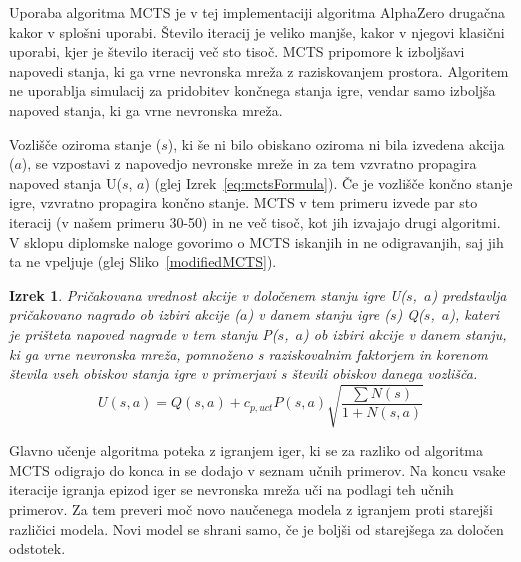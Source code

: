 \documentclass[a4paper, 12pt]{book}
\newtheorem{izrek}{Izrek}[chapter]
\begin{document}
{Uporaba algoritma MCTS je v tej implementaciji algoritma AlphaZero drugačna kakor v splošni uporabi.
Število iteracij je veliko manjše, kakor v njegovi klasični uporabi, kjer je število iteracij več sto tisoč. 
MCTS pripomore k izboljšavi napovedi stanja, ki ga vrne nevronska mreža z raziskovanjem prostora.
Algoritem ne uporablja simulacij za pridobitev končnega stanja igre, vendar samo izboljša napoved stanja, ki ga vrne nevronska mreža.

Vozlišče oziroma stanje ($s$), ki še ni bilo obiskano oziroma ni bila izvedena akcija ($a$), se vzpostavi z napovedjo nevronske mreže in za tem vzvratno propagira napoved stanja U($s$, $a$) (glej Izrek~{\ref{eq:mctsFormula}}).
Če je vozlišče končno stanje igre, vzvratno propagira končno stanje.
MCTS v tem primeru izvede par sto iteracij (v našem primeru 30-50) in ne več tisoč, kot jih izvajajo drugi algoritmi.
V sklopu diplomske naloge govorimo o MCTS iskanjih in ne odigravanjih, saj jih ta ne vpeljuje (glej Sliko~\ref{modifiedMCTS}).

\begin{izrek}
	\label{iz:1}
	Pričakovana vrednost akcije v določenem stanju igre U($s$,~$a$) predstavlja pričakovano nagrado ob izbiri akcije ($a$) v danem stanju igre ($s$) Q($s$,~$a$), kateri je prišteta napoved nagrade v tem stanju P($s$,~$a$) ob izbiri akcije v danem stanju, ki ga vrne nevronska mreža, pomnoženo s raziskovalnim faktorjem in korenom števila vseh obiskov stanja igre v primerjavi s števili obiskov danega vozlišča.
	\begin{equation}
	U(s, a) = Q(s, a) + c_{p,uct}P(s, a)\sqrt{\dfrac{\sum{N(s)}}{1+N(s, a)}}
	\label{eq:mctsFormula}
	\end{equation}
\end{izrek}
\noindent
Glavno učenje algoritma poteka z igranjem iger, ki se za razliko od algoritma MCTS odigrajo do konca in se dodajo v seznam učnih primerov.
Na koncu vsake iteracije igranja epizod iger se nevronska mreža uči na podlagi teh učnih primerov.
Za tem preveri moč novo naučenega modela z igranjem proti starejši različici modela.
Novi model se shrani samo, če je boljši od starejšega za določen odstotek.


}
\end{document}
